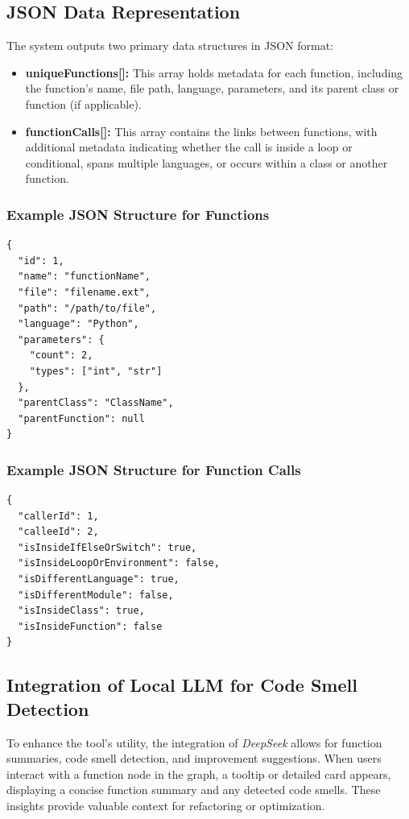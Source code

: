 \documentclass[10pt,twocolumn]{article}
\begin{document}
\subsection{JSON Data Representation}

The system outputs two primary data structures in JSON format:
\begin{itemize}
    \item \textbf{uniqueFunctions[]:} This array holds metadata for each function, including the function’s name, file path, language, parameters, and its parent class or function (if applicable).
    \item \textbf{functionCalls[]:} This array contains the links between functions, with additional metadata indicating whether the call is inside a loop or conditional, spans multiple languages, or occurs within a class or another function.
\end{itemize}

\subsubsection*{Example JSON Structure for Functions}
\begin{verbatim}
{
  "id": 1,
  "name": "functionName",
  "file": "filename.ext",
  "path": "/path/to/file",
  "language": "Python",
  "parameters": {
    "count": 2,
    "types": ["int", "str"]
  },
  "parentClass": "ClassName",
  "parentFunction": null
}
\end{verbatim}

\subsubsection*{Example JSON Structure for Function Calls}
\begin{verbatim}
{
  "callerId": 1,
  "calleeId": 2,
  "isInsideIfElseOrSwitch": true,
  "isInsideLoopOrEnvironment": false,
  "isDifferentLanguage": true,
  "isDifferentModule": false,
  "isInsideClass": true,
  "isInsideFunction": false
}
\end{verbatim}

\subsection{Integration of Local LLM for Code Smell Detection}

To enhance the tool's utility, the integration of \textit{DeepSeek} allows for function summaries, code smell detection, and improvement suggestions. When users interact with a function node in the graph, a tooltip or detailed card appears, displaying a concise function summary and any detected code smells. These insights provide valuable context for refactoring or optimization.
\end{document}
